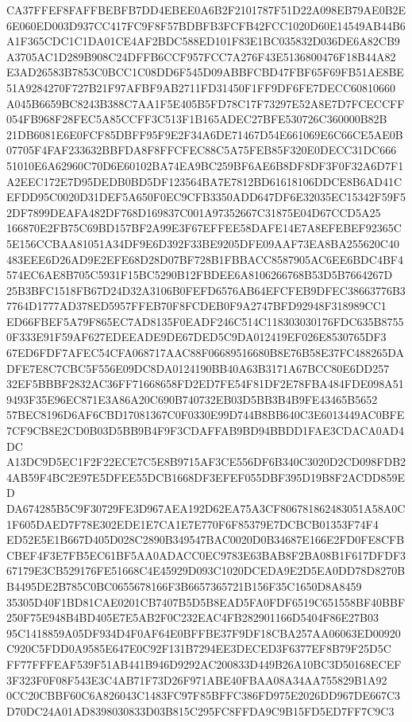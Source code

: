 \documentclass[UTF8,fontset=fandol,zihao=-4,a4paper]{ctexart}
\begin{document}
{{CA37FFEF8FAFFBEBFB7DD4EBEE0A6B2F2101787F51D22A098EB79AE0B2E6E060ED003D937CC417FC9F8F57BDBFB3FCFB42FCC1020D60E14549AB44B6
A1F365CDC1C1DA01CE4AF2BDC588ED101F83E1BC035832D036DE6A82CB9A3705AC1D289B908C24DFFB6CCF957FCC7A276F43E5136800476F18B44A82
E3AD26583B7853C0BCC1C08DD6F545D09ABBFCBD47FBF65F69FB51AE8BE51A9284270F727B21F97AFBF9AB2711FD31450F1FF9DF6FE7DECC60810660
A045B6659BC8243B388C7AA1F5E405B5FD78C17F73297E52A8E7D7FCECCFF054FB968F28FEC5A85CCFF3C513F1B165ADEC27BFE530726C360000B82B
21DB6081E6E0FCF85DBFF95F9E2F34A6DE71467D54E661069E6C66CE5AE0B07705F4FAF233632BBFDA8F8FFCFEC88C5A75FEB85F320E0DECC31DC666
51010E6A62960C70D6E60102BA74EA9BC259BF6AE6B8DF8DF3F0F32A6D7F1A2EEC172E7D95DEDB0BD5DF123564BA7E7812BD61618106DDCE8B6AD41C
EFDD95C0020D31DEF5A650F0EC9CFB3350ADD647DF6E32035EC15342F59F52DF7899DEAFA482DF768D169837C001A97352667C31875E04D67CCD5A25
166870E2FB75C69BD157BF2A99E3F67EFFEE58DAFE14E7A8EFEBEF92365C5E156CCBAA81051A34DF9E6D392F33BE9205DFE09AAF73EA8BA255620C40
483EEE6D26AD9E2EFE68D28D07BF728B1FBBACC8587905AC6EE6BDC4BF4574EC6AE8B705C5931F15BC5290B12FBDEE6A8106266768B53D5B7664267D
25B3BFC1518FB67D24D32A3106B0FEFD6576AB64EFCFEB9DFEC38663776B37764D1777AD378ED5957FFEB70F8FCDEB0F9A2747BFD92948F318989CC1
ED66FBEF5A79F865EC7AD8135F0EADF246C514C118303030176FDC635B87550F333E91F59AF627EDEEADE9DE67DED5C9DA012419EF026E8530765DF3
67ED6FDF7AFEC54CFA068717AAC88F06689516680B8E76B58E37FC488265DADFE7E8C7CBC5F556E09DC8DA0124190BB40A63B3171A67BCC80E6DD257
32EF5BBBF2832AC36FF71668658FD2ED7FE54F81DF2E78FBA484FDE098A519493F35E96EC871E3A86A20C690B740732EB03D5BB3B4B9FE43465B5652
57BEC8196D6AF6CBD17081367C0F0330E99D744B8BB640C3E6013449AC0BFE7CF9CB8E2CD0B03D5BB9B4F9F3CDAFFAB9BD94BBDD1FAE3CDACA0AD4DC
A13DC9D5EC1F2F22ECE7C5E8B9715AF3CE556DF6B340C3020D2CD098FDB24AB59F4BC2E97E5DFEE55DCB1668DF3EFEF055DBF395D19B8F2ACDD859ED
DA674285B5C9F30729FE3D967AEA192D62EA75A3CF806781862483051A58A0C1F605DAED7F78E302EDE1E7CA1E7E770F6F85379E7DCBCB01353F74F4
ED52E5E1B667D405D028C2890B349547BAC0020D0B34687E166E2FD0FE8CFBCBEF4F3E7FB5EC61BF5AA0ADACC0EC9783E63BAB8F2BA08B1F617DFDF3
67179E3CB529176FE51668C4E45929D093C1020DCEDA9E2D5EA0DD78D8270BB4495DE2B785C0BC0655678166F3B6657365721B156F35C1650D8A8459
35305D40F1BD81CAE0201CB7407B5D5B8EAD5FA0FDF6519C651558BF40BBF250F75E948B4BD405E7E5AB2F0C232EAC4FB282901166D5404F86E27B03
95C1418859A05DF934D4F0AF64E0BFFBE37F9DF18CBA257AA06063ED00920C920C5FDD0A9585E647E0C92F131B7294EE3DECED3F6377EF8B79F25D5C
FF77FFFEAF539F51AB441B946D9292AC200833D449B26A10BC3D50168ECEF3F323F0F08F543E3C4AB71F73D26F971ABE40FBAA08A34AA755829B1A92
0CC20CBBF60C6A826043C1483FC97F85BFFC386FD975E2026DD967DE667C3D70DC24A01AD8398030833D03B815C295FC8FFDA9C9B15FD5ED7FF7C9C3
}}
\end{document}
